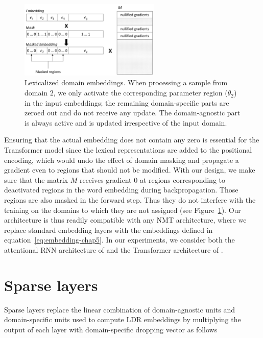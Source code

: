 \begin{figure}[h!]
  \center
  \includegraphics[width=0.6\textwidth]{graphics/embeddings}
  \caption{Lexicalized domain embeddings. When processing a sample from domain $2$, we only activate the corresponding parameter region ($\theta_2$) in the input embeddings; the remaining domain-specific parts are zeroed out and do not receive any update. The domain-agnostic part is always active and is updated irrespective of the input domain.} 
  \label{fig:network-chap5}
\end{figure}

Ensuring that the actual embedding does not contain any zero is essential for the Transformer model since the lexical representations are added to the positional encoding, which would undo the effect of domain masking and propagate a gradient even to regions that should not be modified. With our design, we make sure that the matrix $M$ receives gradient $0$ at regions corresponding to deactivated regions in the word embedding during backpropagation. Those regions are also masked in the forward step. Thus they do not interfere with the training on the domains to which they are not assigned (see Figure~\ref{fig:network-chap5}). Our architecture is thus readily compatible with any NMT architecture, where we replace standard embedding layers with the embeddings defined in equation~\eqref{eq:embedding-chap5}. In our experiments, we consider both the attentional RNN architecture of \citet{Bahdanau15learning} and the Transformer architecture of \citet{Vaswani17attention}.

\section{Sparse layers}
\label{sec:sparse-chap5}
Sparse layers replace the linear combination of domain-agnostic units and domain-specific units used to compute LDR embeddings by multiplying the output of each layer with domain-specific dropping vector as follows

